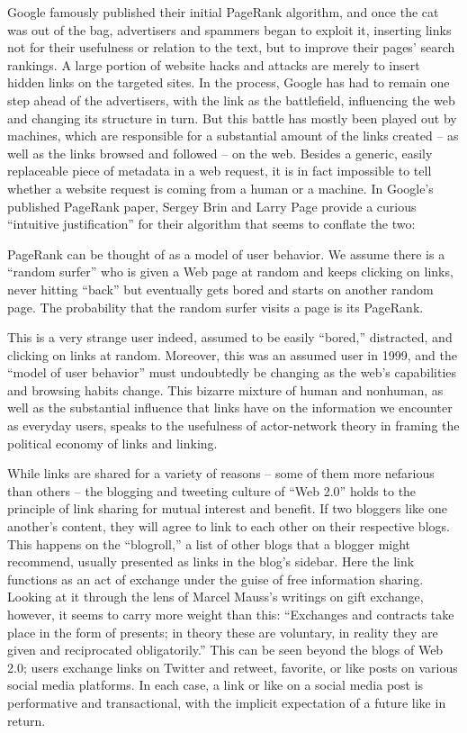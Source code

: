 Google famously published their initial PageRank algorithm, and once the cat was out of the bag, advertisers and spammers began to exploit it, inserting links not for their usefulness or relation to the text, but to improve their pages' search rankings. A large portion of website hacks and attacks are merely to insert hidden links on the targeted sites. In the process, Google has had to remain one step ahead of the advertisers, with the link as the battlefield, influencing the web and changing its structure in turn. But this battle has mostly been played out by machines, which are responsible for a substantial amount of the links created – as well as the links browsed and followed – on the web. Besides a generic, easily replaceable piece of metadata in a web request, it is in fact impossible to tell whether a website request is coming from a human or a machine. In Google's published PageRank paper, Sergey Brin and Larry Page provide a curious ``intuitive justification'' for their algorithm that seems to conflate the two:

PageRank can be thought of as a model of user behavior. We assume there is a ``random surfer'' who is given a Web page at random and keeps clicking on links, never hitting ``back'' but eventually gets bored and starts on another random page. The probability that the random surfer visits a page is its PageRank. 

This is a very strange user indeed, assumed to be easily ``bored,'' distracted, and clicking on links at random. Moreover, this was an assumed user in 1999, and the ``model of user behavior'' must undoubtedly be changing as the web's capabilities and browsing habits change. This bizarre mixture of human and nonhuman, as well as the substantial influence that links have on the information we encounter as everyday users, speaks to the usefulness of actor-network theory in framing the political economy of links and linking.

While links are shared for a variety of reasons – some of them more nefarious than others – the blogging and tweeting culture of ``Web 2.0'' holds to the principle of link sharing for mutual interest and benefit. If two bloggers like one another's content, they will agree to link to each other on their respective blogs. This happens on the ``blogroll,'' a list of other blogs that a blogger might recommend, usually presented as links in the blog's sidebar. Here the link functions as an act of exchange under the guise of free information sharing. Looking at it through the lens of Marcel Mauss's writings on gift exchange, however, it seems to carry more weight than this: ``Exchanges and contracts take place in the form of presents; in theory these are voluntary, in reality they are given and reciprocated obligatorily.''  This can be seen beyond the blogs of Web 2.0; users exchange links on Twitter and retweet, favorite, or like posts on various social media platforms. In each case, a link or like on a social media post is performative and transactional, with the implicit expectation of a future like in return.

